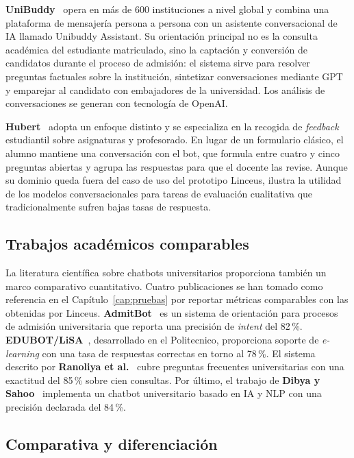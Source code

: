 \textbf{UniBuddy}~\cite{unibuddy,unibuddyAssistant} opera en más de 600 instituciones a nivel global y combina una plataforma de mensajería persona a persona con un asistente conversacional de IA llamado Unibuddy Assistant. Su orientación principal no es la consulta académica del estudiante matriculado, sino la captación y conversión de candidatos durante el proceso de admisión: el sistema sirve para resolver preguntas factuales sobre la institución, sintetizar conversaciones mediante GPT y emparejar al candidato con embajadores de la universidad. Los análisis de conversaciones se generan con tecnología de OpenAI.

\textbf{Hubert}~\cite{hubert} adopta un enfoque distinto y se especializa en la recogida de \textit{feedback} estudiantil sobre asignaturas y profesorado. En lugar de un formulario clásico, el alumno mantiene una conversación con el bot, que formula entre cuatro y cinco preguntas abiertas y agrupa las respuestas para que el docente las revise. Aunque su dominio queda fuera del caso de uso del prototipo Linceus, ilustra la utilidad de los modelos conversacionales para tareas de evaluación cualitativa que tradicionalmente sufren bajas tasas de respuesta.

\subsection{Trabajos académicos comparables}\label{subsec:soluciones-academicos}

La literatura científica sobre chatbots universitarios proporciona también un marco comparativo cuantitativo. Cuatro publicaciones se han tomado como referencia en el Capítulo~\ref{cap:pruebas} por reportar métricas comparables con las obtenidas por Linceus. \textbf{AdmitBot}~\cite{gupta2019admitbot} es un sistema de orientación para procesos de admisión universitaria que reporta una precisión de \textit{intent} del 82\,\%. \textbf{EDUBOT/LiSA}~\cite{colace2018edubot}, desarrollado en el Politecnico, proporciona soporte de \textit{e-learning} con una tasa de respuestas correctas en torno al 78\,\%. El sistema descrito por \textbf{Ranoliya et al.}~\cite{ranoliya2017chatbot} cubre preguntas frecuentes universitarias con una exactitud del 85\,\% sobre cien consultas. Por último, el trabajo de \textbf{Dibya y Sahoo}~\cite{dibya2021chatbot} implementa un chatbot universitario basado en IA y NLP con una precisión declarada del 84\,\%.

\subsection{Comparativa y diferenciación}\label{subsec:soluciones-comparativa}

